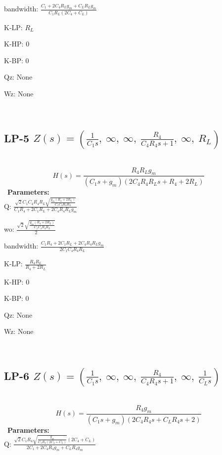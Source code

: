 \documentclass{article}
\begin{document}
bandwidth: $\frac{C_{1} + 2 C_{4} R_{L} g_{m} + C_{L} R_{L} g_{m}}{C_{1} R_{L} \left(2 C_{4} + C_{L}\right)}$\ 

K-LP: $R_{L}$\ 

K-HP: $0$\ 

K-BP: $0$\ 

Qz: $\text{None}$\ 

Wz: $\text{None}$\ 

\ 

\subsection{LP-5 $Z(s) = \left( \frac{1}{C_{1} s}, \  \infty, \  \infty, \  \frac{R_{4}}{C_{4} R_{4} s + 1}, \  \infty, \  R_{L}\right)$ } \ 
\textbf{\[H(s) = \frac{R_{4} R_{L} g_{m}}{\left(C_{1} s + g_{m}\right) \left(2 C_{4} R_{4} R_{L} s + R_{4} + 2 R_{L}\right)}\] } \ 
\textbf{Parameters:}\\ 

Q: $\frac{\sqrt{2} C_{1} C_{4} R_{4} R_{L} \sqrt{\frac{g_{m} \left(R_{4} + 2 R_{L}\right)}{C_{1} C_{4} R_{4} R_{L}}}}{C_{1} R_{4} + 2 C_{1} R_{L} + 2 C_{4} R_{4} R_{L} g_{m}}$\ 

wo: $\frac{\sqrt{2} \sqrt{\frac{g_{m} \left(R_{4} + 2 R_{L}\right)}{C_{1} C_{4} R_{4} R_{L}}}}{2}$\ 

bandwidth: $\frac{C_{1} R_{4} + 2 C_{1} R_{L} + 2 C_{4} R_{4} R_{L} g_{m}}{2 C_{1} C_{4} R_{4} R_{L}}$\ 

K-LP: $\frac{R_{4} R_{L}}{R_{4} + 2 R_{L}}$\ 

K-HP: $0$\ 

K-BP: $0$\ 

Qz: $\text{None}$\ 

Wz: $\text{None}$\ 

\ 

\subsection{LP-6 $Z(s) = \left( \frac{1}{C_{1} s}, \  \infty, \  \infty, \  \frac{R_{4}}{C_{4} R_{4} s + 1}, \  \infty, \  \frac{1}{C_{L} s}\right)$ } \ 
\textbf{\[H(s) = \frac{R_{4} g_{m}}{\left(C_{1} s + g_{m}\right) \left(2 C_{4} R_{4} s + C_{L} R_{4} s + 2\right)}\] } \ 
\textbf{Parameters:}\\ 

Q: $\frac{\sqrt{2} C_{1} R_{4} \sqrt{\frac{g_{m}}{C_{1} R_{4} \left(2 C_{4} + C_{L}\right)}} \left(2 C_{4} + C_{L}\right)}{2 C_{1} + 2 C_{4} R_{4} g_{m} + C_{L} R_{4} g_{m}}$\ 
\end{document}
